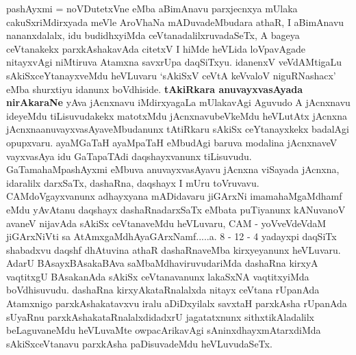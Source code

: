 \begin{artha}
pashAyxmi = noVDutetxVne eMba aBimAnavu parxjecnxya mUlaka cakuSxriMdirxyada meVle AroVhaNa mADuvadeMbudara athaR, I aBimAnavu nananxdalalx, idu budidhxyiMda ceVtanadalilxruvadaSeTx, A bageya ceVtanakekx parxkAshakavAda citetxV I hiMde heVLida loVpavAgade nitayxvAgi niMtiruva Atamxna savxrUpa daqSiTxyu. idanenxV veVdAMtigaLu sAkiSxceYtanayxveMdu heVLuvaru `sAkiSxV ceVtA keVvaloV niguRNashacx' eMba shurxtiyu idanunx boVdhiside. {\bf tAkiRkara anuvayxvasAyada nirAkaraNe} yAva jAcnxnavu iMdirxyagaLa mUlakavAgi Aguvudo A jAcnxnavu ideyeMdu tiLisuvudakekx matotxMdu jAcnxnavubeVkeMdu heVLutAtx jAcnxna jAcnxnaanuvayxvasAyaveMbudanunx tAtiRkaru sAkiSx ceYtanayxkekx badalAgi opupxvaru. ayaMGaTaH ayaMpaTaH eMbudAgi baruva modalina jAcnxnaveV vayxvasAya idu GaTapaTAdi daqshayxvanunx tiLisuvudu. GaTamahaMpashAyxmi eMbuva anuvayxvasAyavu jAcnxna viSayada jAcnxna, idaralilx darxSaTx, dashaRna, daqshayx I mUru toVruvavu. CAMdoVgayxvanunx adhayxyana mADidavaru jiGArxNi imamahaMgaMdhamf eMdu yAvAtanu daqshayx dashaRnadarxSaTx eMbata puTiyanunx kANuvanoV avaneV nijavAda sAkiSx ceVtanaveMdu heVLuvaru, CAM - yoVveVdeVdaM jiGArxNiVti sa AtAmxgaMdhAyaGArxNamf.....a. 8 - 12 - 4 yadayxpi daqSiTx shabadxvu daqshf dhAtuvina athaR dashaRnaveMba kirxyeyanunx heVLuvaru. AdarU BAsayxBAsakaBAva saMbaMdhaviruvudariMda dashaRna kirxyA vaqtitxgU BAsakanAda sAkiSx ceVtanavanunx lakaSxNA vaqtitxyiMda boVdhisuvudu. dashaRna kirxyAkataRnalalxda nitayx ceVtana rUpanAda Atamxnigo parxkAshakatavxvu iralu aDiDxyilalx savxtaH parxkAsha rUpanAda sUyaRnu parxkAshakataRnalalxdidadxrU jagatatxnunx sithxtikAladalilx beLaguvaneMdu heVLuvaMte owpacArikavAgi sAninxdhayxmAtarxdiMda sAkiSxceVtanavu parxkAsha paDisuvadeMdu heVLuvudaSeTx.
\end{artha}%


